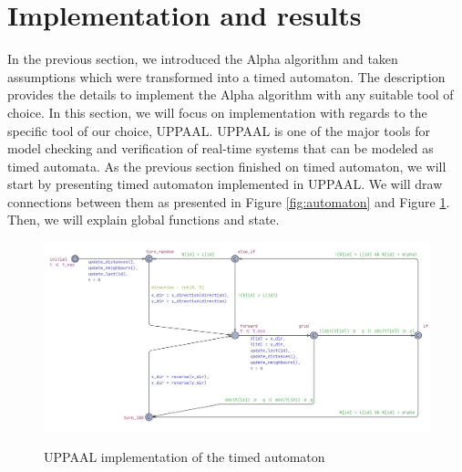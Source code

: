 \section{Implementation and results}
In the previous section, we introduced the Alpha algorithm and taken assumptions which were transformed into a timed automaton. The description provides the details to implement the Alpha algorithm with any suitable tool of choice. In this section, we will focus on implementation with regards to the specific tool of our choice, UPPAAL. UPPAAL is one of the major tools for model checking and verification of real-time systems that can be modeled as timed automata. As the previous section finished on timed automaton, we will start by presenting timed automaton implemented in UPPAAL. We will draw connections between them as presented in Figure \ref{fig:automaton} and Figure \ref{fig:automaton_uppaal}. Then, we will explain global functions and state.

\begin{figure}[H]
\caption{UPPAAL implementation of the timed automaton}
\includegraphics[width=\textwidth]{images/automaton_uppaal.png}
\label{fig:automaton_uppaal}
\end{figure}

